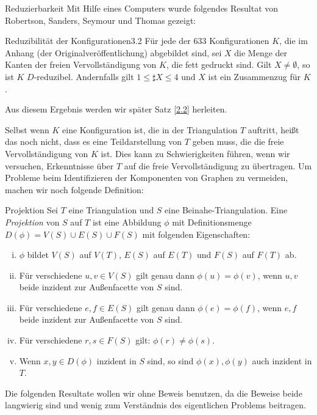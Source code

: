 \begin{section}{Reduzierbarkeit}
 Mit Hilfe eines Computers wurde folgendes Resultat von Robertson, Sanders, Seymour und Thomas gezeigt:
 
 \begin{satzl}{Reduzibilität der Konfigurationen}{3.2}
  Für jede der 633 Konfigurationen $K$, die im Anhang (der Originalveröffentlichung) abgebildet sind, sei $X$ die Menge der Kanten der freien Vervollständigung von $K$, die fett gedruckt sind. Gilt $X \neq \emptyset$, so ist $K$ $D$-reduzibel. Andernfalls gilt $1\leq \sharp X \leq 4$ und $X$ ist ein Zusammenzug für $K$.
 \end{satzl}
 
 Aus diesem Ergebnis werden wir später Satz \ref{2.2} herleiten.

 Selbst wenn $K$ eine Konfiguration ist, die in der Triangulation $T$ auftritt, heißt das noch nicht, dass es eine Teildarstellung von $T$ geben muss, die die freie Vervollständigung von $K$ ist. Dies kann zu Schwierigkeiten führen, wenn wir versuchen, Erkenntnisse über $T$ auf die freie Vervollständigung zu übertragen. Um Probleme beim Identifizieren der Komponenten von Graphen zu vermeiden, machen wir noch folgende Definition:
 
 \begin{definition}{Projektion}
  Sei $T$ eine Triangulation und $S$ eine Beinahe-Triangulation. Eine \textit{Projektion} von $S$ auf $T$ ist eine Abbildung $\phi$ mit Definitionsmenge $D(\phi) = V(S)\cup E(S)\cup F(S)$ mit folgenden Eigenschaften:
  \begin{enumerate}[(i)]
   \item $\phi$ bildet $V(S)$ auf $V(T)$, $E(S)$ auf $E(T)$ und $F(S)$ auf $F(T)$ ab.
   \item Für verschiedene $u,v \in V(S)$ gilt genau dann $\phi(u) = \phi(v)$, wenn $u,v$ beide inzident zur Außenfacette von $S$ sind.
   \item Für verschiedene $e,f \in E(S)$ gilt genau dann $\phi(e) = \phi(f)$, wenn $e,f$ beide inzident zur Außenfacette von $S$ sind.
   \item Für verschiedene $r,s \in F(S)$ gilt: $\phi(r) \neq \phi(s)$.
   \item Wenn $x,y \in D(\phi)$ inzident in $S$ sind, so sind $\phi(x),\phi(y)$ auch inzident in $T$.
  \end{enumerate}
 \end{definition}
 
 Die folgenden Resultate wollen wir ohne Beweis benutzen, da die Beweise beide langwierig sind und wenig zum Verständnis des eigentlichen Problems beitragen.


\end{section}
